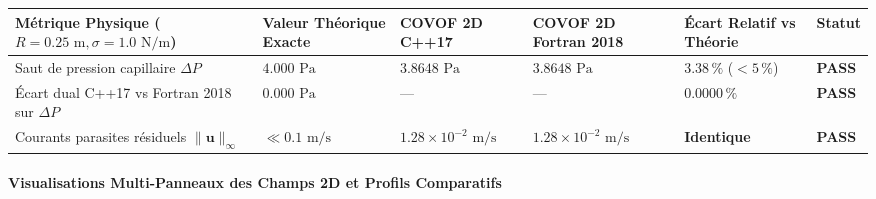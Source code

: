\documentclass[
  10pt,
]{article}
\newcounter{none} %
\begin{document}
{\def\LTcaptype{none} %
\begin{longtable}[]{@{}
  >{\raggedright\arraybackslash}p{}
  >{\centering\arraybackslash}p{}
  >{\centering\arraybackslash}p{}
  >{\centering\arraybackslash}p{}
  >{\centering\arraybackslash}p{}
  >{\centering\arraybackslash}p{}@{}}
\toprule\noalign{}
\begin{minipage}[b]{\linewidth}\raggedright
Métrique Physique (\(R = 0.25\text{ m}, \sigma = 1.0\text{ N/m}\))
\end{minipage} & \begin{minipage}[b]{\linewidth}\centering
Valeur Théorique Exacte
\end{minipage} & \begin{minipage}[b]{\linewidth}\centering
COVOF 2D C++17
\end{minipage} & \begin{minipage}[b]{\linewidth}\centering
COVOF 2D Fortran 2018
\end{minipage} & \begin{minipage}[b]{\linewidth}\centering
Écart Relatif vs Théorie
\end{minipage} & \begin{minipage}[b]{\linewidth}\centering
Statut
\end{minipage} \\
\midrule\noalign{}
\endhead
\bottomrule\noalign{}
\endlastfoot
Saut de pression capillaire \(\Delta P\) & \(4.000\text{ Pa}\) &
\textbf{\(3.8648\text{ Pa}\)} & \textbf{\(3.8648\text{ Pa}\)} &
\textbf{\(3.38\,\%\)} (\(< 5\,\%\)) & \textbf{PASS} \\
Écart dual C++17 vs Fortran 2018 sur \(\Delta P\) & \(0.000\text{ Pa}\)
& --- & --- & \textbf{\(0.0000\,\%\)} & \textbf{PASS} \\
Courants parasites résiduels \(\|\mathbf{u}\|_\infty\) &
\(\ll 0.1\text{ m/s}\) & \textbf{\(1.28 \times 10^{-2}\text{ m/s}\)} &
\textbf{\(1.28 \times 10^{-2}\text{ m/s}\)} & \textbf{Identique} &
\textbf{PASS} \\
\end{longtable}
}

\paragraph{Visualisations Multi-Panneaux des Champs 2D et Profils
Comparatifs}\label{visualisations-multi-panneaux-des-champs-2d-et-profils-comparatifs-11}
\end{document}
